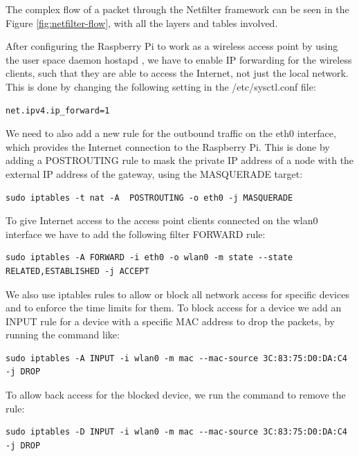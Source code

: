 The complex flow of a packet through the Netfilter framework can be seen in the Figure \ref{fig:netfilter-flow}, with all the layers and tables involved.

After configuring the Raspberry Pi to work as a wireless access point \citep{raspberryPiAccessPoint} by using the user space daemon hostapd \citep{hostapd}, we have to enable IP forwarding for the wireless clients, such that they are able to access the Internet, not just the local network.  This is done by changing the following setting in the /etc/sysctl.conf file:

\begin{lstlisting}
net.ipv4.ip_forward=1
\end{lstlisting}

We need to also add a new rule for the outbound traffic on the eth0 interface, which provides the Internet connection to the Raspberry Pi. This is done by adding a POSTROUTING rule to mask the private IP address of a node with the external IP address of the gateway, using the MASQUERADE target: 

\begin{lstlisting}
sudo iptables -t nat -A  POSTROUTING -o eth0 -j MASQUERADE
\end{lstlisting}

To give Internet access to the access point clients connected on the wlan0 interface we have to add the following filter FORWARD rule:

\begin{lstlisting}
sudo iptables -A FORWARD -i eth0 -o wlan0 -m state --state RELATED,ESTABLISHED -j ACCEPT
\end{lstlisting}

We also use iptables rules to allow or block all network access for specific devices and to enforce the time limits for them. To block access for a device we add an INPUT rule for a device with a specific MAC address to drop the packets, by running the command like:

\begin{lstlisting}
sudo iptables -A INPUT -i wlan0 -m mac --mac-source 3C:83:75:D0:DA:C4 -j DROP
\end{lstlisting}

To allow back access for the blocked device, we run the command to remove the rule:

\begin{lstlisting}
sudo iptables -D INPUT -i wlan0 -m mac --mac-source 3C:83:75:D0:DA:C4 -j DROP
\end{lstlisting}


